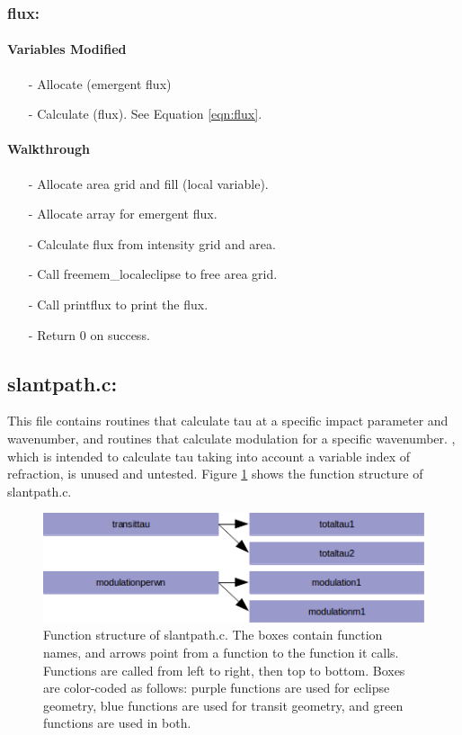 \documentclass[letterpaper,12pt]{article}
\begin{document}
\subsubsection{flux:}
\paragraph{Variables Modified}
\begin{enumerate}[leftmargin=10pt, noitemsep, parsep=0pt, topsep=0ex]
\item[-] Allocate  (emergent flux)
\item[-] Calculate  (flux). See Equation \ref{eqn:flux}.
\end{enumerate}

\noindent
\paragraph{Walkthrough}
\begin{enumerate}[leftmargin=10pt, noitemsep, parsep=0pt, topsep=0ex]
\item[-] Allocate area grid and fill (local variable).
\item[-] Allocate array for emergent flux.
\item[-] Calculate flux from intensity grid and area.
\item[-] Call freemem\_localeclipse to free area grid.
\item[-] Call printflux to print the flux.
\item[-] Return 0 on success.
\end{enumerate}

\newpage
\subsection{slantpath.c:}
This file contains routines that calculate tau at a specific impact parameter and wavenumber, and routines that calculate modulation for a specific wavenumber. , which is intended to calculate tau taking into account a variable index of refraction, is unused and untested. Figure \ref{fig:slantpathc} shows the function structure of slantpath.c.

\begin{figure}
\includegraphics{fig/slantpathc}
\caption{Function structure of slantpath.c. The boxes contain function names, and arrows point from a function to the function it calls. Functions are called from left to right, then top to bottom.  Boxes are color-coded as follows:  purple functions are used for eclipse geometry, blue functions are used for transit geometry, and green functions are used in both.}
\label{fig:slantpathc}
\end{figure}
\end{document}
